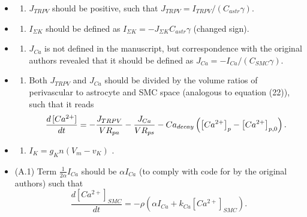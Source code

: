 \documentclass[10pt,a4paper,onecolumn]{article}
\newcommand{\tightlist}{%
  \setlength{\itemsep}{1pt}\setlength{\parskip}{0pt}\setlength{\parsep}{0pt}}
\begin{document}
\begin{itemize}
\item
  \begin{enumerate}
  \def\labelenumi{(\arabic{enumi})}
  \setcounter{enumi}{9}
  \tightlist
  \item
    \(J_{TRPV}\) should be positive, such that
    \(J_{TRPV} = I_{TRPV}/(C_{astr} \gamma)\).
  \end{enumerate}
\item
  \begin{enumerate}
  \def\labelenumi{(\arabic{enumi})}
  \setcounter{enumi}{19}
  \tightlist
  \item
    \(I_{\Sigma K}\) should be defined as
    \(I_{\Sigma K} = -J_{\Sigma K} C_{astr} \gamma\) (changed sign).
  \end{enumerate}
\item
  \begin{enumerate}
  \def\labelenumi{(\arabic{enumi})}
  \setcounter{enumi}{22}
  \tightlist
  \item
    \(J_{Ca}\) is not defined in the manuscript, but correspondence with
    the original authors revealed that it should be defined as
    \(J_{Ca} = -I_{Ca}/(C_{SMC} \gamma)\).
  \end{enumerate}
\item
  \begin{enumerate}
  \def\labelenumi{(\arabic{enumi})}
  \setcounter{enumi}{22}
  \tightlist
  \item
    Both \(J_{TRPV}\) and \(J_{Ca}\) should be divided by the volume
    ratios of perivascular to astrocyte and SMC space (analogous to
    equation (22)), such that it reads
    \[\frac{d \left[ Ca\textsuperscript{2+} \right] }{dt} = -\frac{J_{TRPV}}{VR_{pa}} - \frac{J_{Ca}}{VR_{ps}} - Ca_{decay} \left( \left[ Ca\textsuperscript{2+} \right]_p - \left[ Ca\textsuperscript{2+} \right]_{p,0} \right).\]
  \end{enumerate}
\item
  \begin{enumerate}
  \def\labelenumi{(\arabic{enumi})}
  \setcounter{enumi}{30}
  \tightlist
  \item
    \(I_K = g_K n (V_m - v_K)\) \autocite{Farr2011}.
  \end{enumerate}
\item
  (A.1) Term \(\frac{1}{2 \alpha} I_{Ca}\) should be \(\alpha I_{Ca}\)
  (to comply with code for \autocite{Witthoft2013} by the original
  authors) such that
  \[\frac{d \left[ Ca^{2+} \right]_{SMC}}{dt} = -\rho \left( \alpha I_{Ca} + k_{Ca} \left[ Ca^{2+} \right]_{SMC} \right).\]

\end{itemize}
\end{document}
